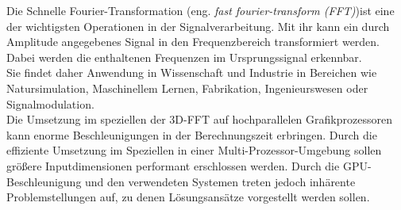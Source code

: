 
Die Schnelle Fourier-Transformation (eng. \textit{fast fourier-transform (FFT)})ist eine der wichtigsten Operationen in der Signalverarbeitung. Mit ihr kann ein durch Amplitude angegebenes Signal in den Frequenzbereich transformiert werden. Dabei werden die enthaltenen Frequenzen im Ursprungssignal erkennbar.\\
Sie findet daher Anwendung in Wissenschaft und Industrie in Bereichen wie Natursimulation, Maschinellem Lernen, Fabrikation, Ingenieurswesen oder Signalmodulation.\\
Die Umsetzung im speziellen der 3D-FFT auf hochparallelen Grafikprozessoren kann enorme Beschleunigungen in der Berechnungszeit erbringen.
Durch die effiziente Umsetzung im Speziellen in einer Multi-Prozessor-Umgebung sollen größere Inputdimensionen performant erschlossen werden. Durch die GPU-Beschleunigung und den verwendeten Systemen treten jedoch inhärente Problemstellungen auf, zu denen Lösungsansätze vorgestellt werden sollen.\\

